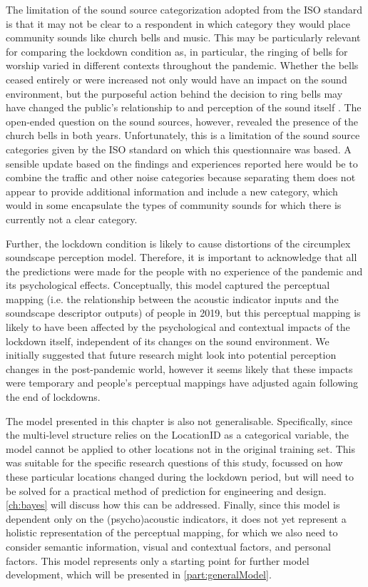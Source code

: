    The limitation of the sound source categorization adopted from the ISO standard is that it may not be clear to a respondent in which category they would place community sounds like church bells and music. This may be particularly relevant for comparing the lockdown condition as, in particular, the ringing of bells for worship varied in different contexts throughout the pandemic. Whether the bells ceased entirely or were increased not only would have an impact on the sound environment, but the purposeful action behind the decision to ring bells may have changed the public's relationship to and perception of the sound itself \citep{Parker2020Anthropause}. The open-ended question on the sound sources, however, revealed the presence of the church bells in both years. Unfortunately, this is a limitation of the sound source categories given by the ISO standard on which this questionnaire was based. A sensible update based on the findings and experiences reported here would be to combine the traffic and other noise categories because separating them does not appear to provide additional information and include a new category, which would in some encapsulate the types of community sounds for which there is currently not a clear category.

   Further, the lockdown condition is likely to cause distortions of the circumplex soundscape perception model. Therefore, it is important to acknowledge that all the predictions were made for the people with no experience of the pandemic and its psychological effects. Conceptually, this model captured the perceptual mapping (i.e. the relationship between the acoustic indicator inputs and the soundscape descriptor outputs) of people in 2019, but this perceptual mapping is likely to have been affected by the psychological and contextual impacts of the lockdown itself, independent of its changes on the sound environment. We initially suggested that future research might look into potential perception changes in the post-pandemic world, however it seems likely that these impacts were temporary and people's perceptual mappings have adjusted again following the end of lockdowns.

   The model presented in this chapter is also not generalisable. Specifically, since the multi-level structure relies on the LocationID as a categorical variable, the model cannot be applied to other locations not in the original training set. This was suitable for the specific research questions of this study, focussed on how these particular locations changed during the lockdown period, but will need to be solved for a practical method of prediction for engineering and design. \cref{ch:bayes} will discuss how this can be addressed. Finally, since this model is dependent only on the (psycho)acoustic indicators, it does not yet represent a holistic representation of the perceptual mapping, for which we also need to consider semantic information, visual and contextual factors, and personal factors. This model represents only a starting point for further model development, which will be presented in \cref{part:generalModel}.

